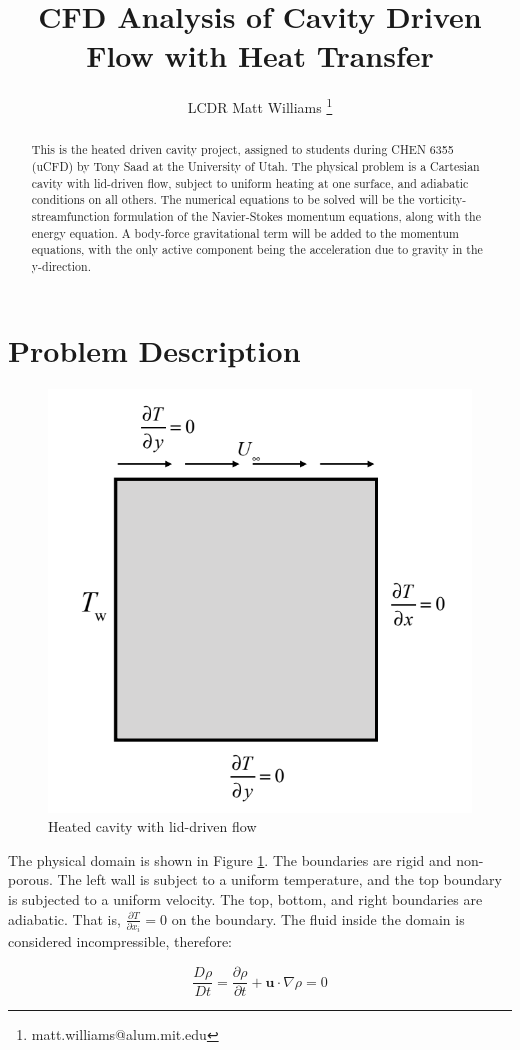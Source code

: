 \documentclass[journal]{new-aiaa}
\title{CFD Analysis of Cavity Driven Flow with Heat Transfer}
\author{LCDR Matt Williams \footnote{matt.williams@alum.mit.edu}}
\affil{Course Director, US Navy Engineering Duty Officer School, Port Hueneme, CA}
\begin{document}
\maketitle
\begin{abstract}
This is the heated driven cavity project, assigned to students during CHEN 6355 (uCFD) by Tony Saad at the University of Utah. The physical problem is a Cartesian cavity with lid-driven flow, subject to uniform heating at one surface, and adiabatic conditions on all others. The numerical equations to be solved will be the vorticity-streamfunction formulation of the Navier-Stokes momentum equations, along with the energy equation. A body-force gravitational term will be added to the momentum equations, with the only active component being the acceleration due to gravity in the y-direction.
\end{abstract}

\section{Problem Description}
\begin{figure}[hbt!]
\centering
\includegraphics[width=.5\textwidth]{cavity}
\caption{Heated cavity with lid-driven flow}
\label{fig:domain} 
\end{figure}

The physical domain is shown in Figure \ref{fig:domain}. The boundaries are rigid and non-porous. The left wall is subject to a uniform temperature, and the top boundary is subjected to a uniform velocity. The top, bottom, and right boundaries are adiabatic. That is, $\frac{\partial T}{\partial x_i} = 0$ on the boundary. The fluid inside the domain is considered incompressible, therefore:

\begin{equation}
\label{equation:incompressible}
\frac{D\rho }{Dt} =\frac{\partial \rho }{\partial t} +\textbf{u}\cdot \nabla \rho =0
\end{equation}
\end{document}
